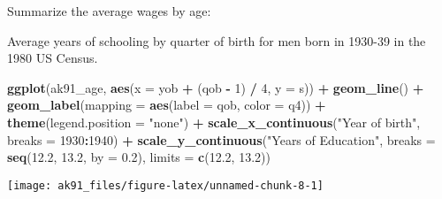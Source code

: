 \documentclass[]{book}
\newenvironment{Shaded}{\begin{snugshade}}{\end{snugshade}}
\newcommand{\DataTypeTok}[1]{\textcolor[rgb]{0.13,0.29,0.53}{#1}}
\newcommand{\DecValTok}[1]{\textcolor[rgb]{0.00,0.00,0.81}{#1}}
\newcommand{\FloatTok}[1]{\textcolor[rgb]{0.00,0.00,0.81}{#1}}
\newcommand{\KeywordTok}[1]{\textcolor[rgb]{0.13,0.29,0.53}{\textbf{#1}}}
\newcommand{\NormalTok}[1]{#1}
\newcommand{\OperatorTok}[1]{\textcolor[rgb]{0.81,0.36,0.00}{\textbf{#1}}}
\newcommand{\StringTok}[1]{\textcolor[rgb]{0.31,0.60,0.02}{#1}}
\theoremstyle{definition}
\theoremstyle{definition}
\theoremstyle{definition}
\theoremstyle{remark}
\begin{document}
Summarize the average wages by age:

\begin{Shaded}
\end{Shaded}

Average years of schooling by quarter of birth for men born in 1930-39
in the 1980 US Census.

\begin{Shaded}
\begin{Highlighting}[]
\KeywordTok{ggplot}\NormalTok{(ak91_age, }\KeywordTok{aes}\NormalTok{(}\DataTypeTok{x =}\NormalTok{ yob }\OperatorTok{+}\StringTok{ }\NormalTok{(qob }\OperatorTok{-}\StringTok{ }\DecValTok{1}\NormalTok{) }\OperatorTok{/}\StringTok{ }\DecValTok{4}\NormalTok{, }\DataTypeTok{y =}\NormalTok{ s)) }\OperatorTok{+}
\StringTok{  }\KeywordTok{geom_line}\NormalTok{() }\OperatorTok{+}
\StringTok{  }\KeywordTok{geom_label}\NormalTok{(}\DataTypeTok{mapping =} \KeywordTok{aes}\NormalTok{(}\DataTypeTok{label =}\NormalTok{ qob, }\DataTypeTok{color =}\NormalTok{ q4)) }\OperatorTok{+}
\StringTok{  }\KeywordTok{theme}\NormalTok{(}\DataTypeTok{legend.position =} \StringTok{"none"}\NormalTok{) }\OperatorTok{+}
\StringTok{  }\KeywordTok{scale_x_continuous}\NormalTok{(}\StringTok{"Year of birth"}\NormalTok{, }\DataTypeTok{breaks =} \DecValTok{1930}\OperatorTok{:}\DecValTok{1940}\NormalTok{) }\OperatorTok{+}
\StringTok{  }\KeywordTok{scale_y_continuous}\NormalTok{(}\StringTok{"Years of Education"}\NormalTok{, }\DataTypeTok{breaks =} \KeywordTok{seq}\NormalTok{(}\FloatTok{12.2}\NormalTok{, }\FloatTok{13.2}\NormalTok{, }\DataTypeTok{by =} \FloatTok{0.2}\NormalTok{),}
                     \DataTypeTok{limits =} \KeywordTok{c}\NormalTok{(}\FloatTok{12.2}\NormalTok{, }\FloatTok{13.2}\NormalTok{))}
\end{Highlighting}
\end{Shaded}

\begin{center}\texttt{[image: ak91\_files/figure-latex/unnamed-chunk-8-1]} \end{center}
\end{document}
